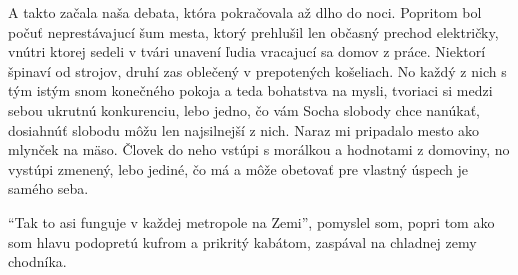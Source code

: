 \documentclass[12pt, a4paper]{article}
\begin{document}
A takto začala naša debata, która pokračovala až dlho do noci.
Popritom bol počuť neprestávajucí šum mesta, ktorý prehlušil len občasný prechod električky, vnútri ktorej sedeli v tvári unavení ľudia vracajucí sa domov z práce. Niektorí špinaví od strojov, druhí zas oblečený v prepotených košeliach.
No každý z nich s tým istým snom konečného pokoja a teda bohatstva na mysli, tvoriaci si medzi sebou ukrutnú konkurenciu, lebo jedno, čo vám Socha slobody chce nanúkať, dosiahnúť slobodu môžu len najsilnejší z nich. Naraz mi pripadalo mesto ako mlynček na mäso.
Človek do neho vstúpi s morálkou a hodnotami z domoviny, no vystúpi zmenený, lebo jediné, čo má a môže obetovať pre vlastný úspech je samého seba.

\enquote{Tak to asi funguje v každej metropole na Zemi}, pomyslel som, popri tom ako som hlavu podopretú kufrom a prikritý kabátom, zaspával na chladnej zemy chodníka.
\end{document}
